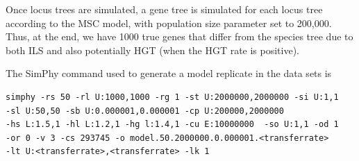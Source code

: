 Once locus trees are simulated, a gene tree is simulated for each locus tree according to the MSC model,  with population size parameter set to 200,000.  Thus, at the end, we have 1000 true genes that differ from the species tree due to both ILS and also potentially HGT (when the HGT rate is positive).

The SimPhy command used to generate a model replicate in the data sets is%
\begin{verbatim}
simphy -rs 50 -rl U:1000,1000 -rg 1 -st U:2000000,2000000 -si U:1,1 
-sl U:50,50 -sb U:0.000001,0.000001 -cp U:200000,2000000 
-hs L:1.5,1 -hl L:1.2,1 -hg l:1.4,1 -cu E:10000000  -so U:1,1 -od 1 
-or 0 -v 3 -cs 293745 -o model.50.2000000.0.000001.<transferrate>  
-lt U:<transferrate>,<transferrate> -lk 1
 \end{verbatim}
 




